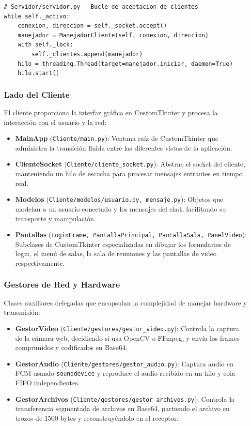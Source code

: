 \documentclass[12pt,a4paper]{article}
\begin{document}
\begin{lstlisting}
# Servidor/servidor.py - Bucle de aceptacion de clientes
while self._activo:
    conexion, direccion = self._socket.accept()
    manejador = ManejadorCliente(self, conexion, direccion)
    with self._lock:
        self._clientes.append(manejador)
    hilo = threading.Thread(target=manejador.iniciar, daemon=True)
    hilo.start()
\end{lstlisting}

\subsubsection{Lado del Cliente}
El cliente proporciona la interfaz gr\'afica en CustomTkinter y procesa la interacci\'on con el usuario y la red:
\begin{itemize}
    \item \textbf{MainApp} (\texttt{Cliente/main.py}): Ventana ra\'iz de CustomTkinter que administra la transici\'on fluida entre las diferentes vistas de la aplicaci\'on.
    \item \textbf{ClienteSocket} (\texttt{Cliente/cliente\_socket.py}): Abstrae el socket del cliente, manteniendo un hilo de escucha para procesar mensajes entrantes en tiempo real.
    \item \textbf{Modelos} (\texttt{Cliente/modelos/usuario.py, mensaje.py}): Objetos que modelan a un usuario conectado y los mensajes del chat, facilitando su transporte y manipulaci\'on.
    \item \textbf{Pantallas} (\texttt{LoginFrame, PantallaPrincipal, PantallaSala, PanelVideo}): Subclases de CustomTkinter especializadas en dibujar los formularios de login, el men\'u de salas, la sala de reuniones y las pantallas de video respectivamente.
\end{itemize}

\subsubsection{Gestores de Red y Hardware}
Clases auxiliares delegadas que encapsulan la complejidad de manejar hardware y transmisi\'on:
\begin{itemize}
    \item \textbf{GestorVideo} (\texttt{Cliente/gestores/gestor\_video.py}): Controla la captura de la c\'amara web, decidiendo si usa OpenCV o FFmpeg, y env\'ia los frames comprimidos y codificados en Base64.
    \item \textbf{GestorAudio} (\texttt{Cliente/gestores/gestor\_audio.py}): Captura audio en PCM usando \texttt{sounddevice} y reproduce el audio recibido en un hilo y cola FIFO independientes.
    \item \textbf{GestorArchivos} (\texttt{Cliente/gestores/gestor\_archivos.py}): Controla la transferencia segmentada de archivos en Base64, partiendo el archivo en trozos de 1500 bytes y reconstruy\'endolo en el receptor.
\end{itemize}
\end{document}
